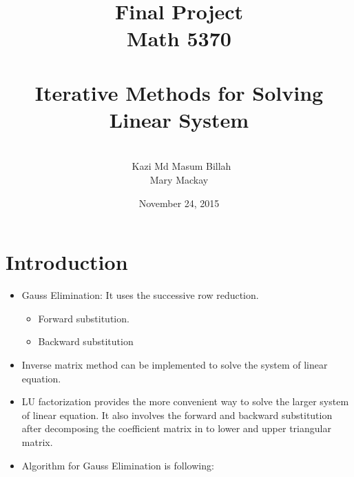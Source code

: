 \documentclass[12pt]{beamer}
\begin{document}
	\author[Kazi Md Masum Billah ]{\scriptsize  \\[0.17cm]\ Kazi Md Masum Billah \\ Mary Mackay}
	\title[]{\small Final Project\\
	Math 5370\\
	~\\
	\Large Iterative Methods for Solving Linear System}
	\date{November 24, 2015}

	\maketitle
	
	\section[Outline]{}
	\begin{frame}{ }
	\tableofcontents
    \end{frame}	
	\section{Introduction}
	
	\begin{frame}
	\begin{itemize}
	\item Gauss Elimination: It uses the successive row reduction.
	\begin{itemize}
	\item Forward substitution.
	\item Backward substitution
	
	\end{itemize}
	\item Inverse matrix method can be implemented to solve the system of linear equation.
	\item LU factorization provides the more convenient way to solve the larger system of linear equation. It also involves the forward and backward substitution after decomposing the coefficient matrix in to lower and upper triangular matrix. 
    	\item Algorithm for Gauss Elimination is following:\\
	\end{itemize}
	\end{frame}
\end{document}
